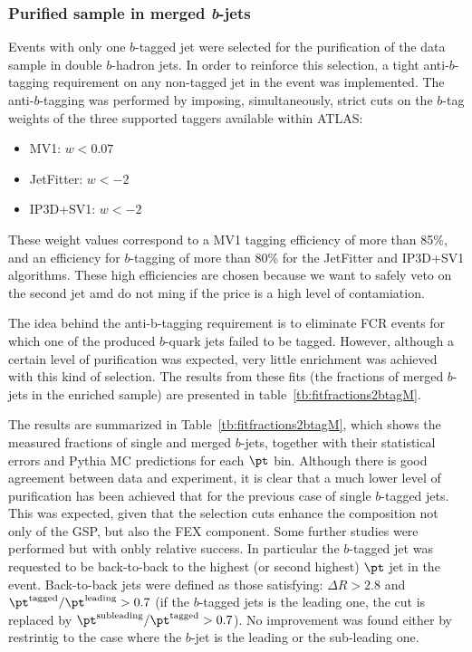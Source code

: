 \subsubsection{Purified sample in merged {\em b}-jets}

Events with only one $b$-tagged jet were selected for the purification of the data sample in double $b$-hadron jets.  In order to reinforce this selection, a tight anti-$b$-tagging requirement on any non-tagged jet in the event was implemented.  The anti-$b$-tagging was performed by imposing, simultaneously, strict cuts on the $b$-tag weights of the three supported taggers available within ATLAS:
%
\begin{itemize}
\item
MV1:  $w < 0.07$  
\item
JetFitter:  $w < -2$
\item
IP3D+SV1:  $w < -2$
\end{itemize}
%
These weight values correspond to a MV1 tagging efficiency of more than 85\%, and an efficiency for $b$-tagging of more than 80\% for the JetFitter and IP3D+SV1 algorithms. These high efficiencies are chosen because we want to safely veto on the second jet amd do not ming if the price is a high level of contamiation.

The idea behind the anti-b-tagging requirement is to eliminate FCR events for which one of the produced $b$-quark jets failed to be tagged. However, although a certain level of purification was expected, very little enrichment was achieved with this kind of selection. The results from these fits (the fractions of merged $b$-jets in the enriched sample) are presented in  table~\ref{tb:fitfractions2btagM}.

The results are summarized in Table~\ref{tb:fitfractions2btagM}, which shows the measured fractions of single and merged $b$-jets, together with their statistical errors and {\sc Pythia} MC predictions for each $\pt$ bin. Although there is good agreement between data and experiment, it is clear that a much lower level of purification has been achieved that for the previous case of single $b$-tagged jets. This was expected, given that the selection cuts enhance the composition not only of the GSP, but also the FEX component. Some further studies were performed but with onbly relative success. In particular the $b$-tagged jet was requested to be back-to-back to the highest (or second highest) $\pt$ jet in the event.  Back-to-back jets were defined as those satisfying:  $\Delta R>2.8$ and  $\pt^\text{tagged}/\pt^\text{leading} > 0.7$  (if the $b$-tagged jets is the leading one, the cut is replaced by $\pt^\text{subleading}/\pt^\text{tagged} > 0.7$). No improvement was found either by restrintig to the case where the $b$-jet is the leading or the sub-leading one.

